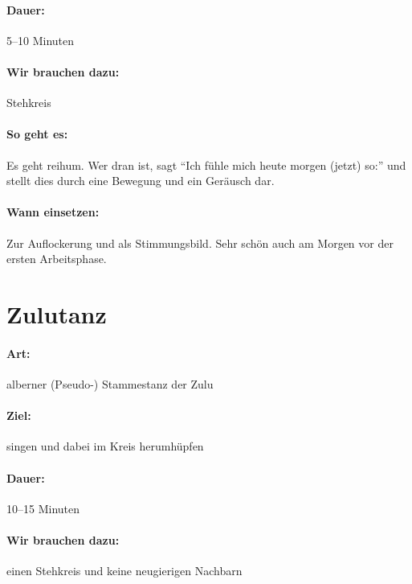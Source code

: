 \paragraph{Dauer:} 5--10 Minuten
\paragraph{Wir brauchen dazu:} Stehkreis
\paragraph{So geht es:} Es geht reihum. Wer dran ist, sagt "`Ich fühle mich heute morgen (jetzt) so:"' und stellt dies durch eine Bewegung und ein Geräusch dar.
\paragraph{Wann einsetzen:} Zur Auflockerung und als Stimmungsbild. Sehr schön auch am Morgen vor der ersten Arbeitsphase.

\section{Zulutanz}
\paragraph{Art:} alberner (Pseudo-) Stammestanz der Zulu
\paragraph{Ziel:} singen und dabei im Kreis herumhüpfen
\paragraph{Dauer:} 10--15 Minuten
\paragraph{Wir brauchen dazu:} einen Stehkreis und keine neugierigen Nachbarn
